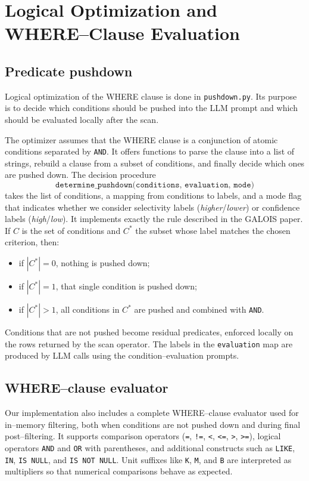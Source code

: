 \documentclass[11pt]{article}
\begin{document}
\clearpage
\section{Logical Optimization and WHERE–Clause Evaluation}

\subsection{Predicate pushdown}

Logical optimization of the WHERE clause is done in \texttt{pushdown.py}. Its purpose is to decide which conditions should be pushed into the LLM prompt and which should be evaluated locally after the scan.

The optimizer assumes that the WHERE clause is a conjunction of atomic conditions separated by \texttt{AND}. It offers functions to parse the clause into a list of strings, rebuild a clause from a subset of conditions, and finally decide which ones are pushed down. The decision procedure
\[
\texttt{determine\_pushdown(conditions, evaluation, mode)}
\]
takes the list of conditions, a mapping from conditions to labels, and a mode flag that indicates whether we consider selectivity labels (\emph{higher}/\emph{lower}) or confidence labels (\emph{high}/\emph{low}). It implements exactly the rule described in the GALOIS paper. If $C$ is the set of conditions and $C^\ast$ the subset whose label matches the chosen criterion, then:
\begin{itemize}
  \item if $|C^\ast| = 0$, nothing is pushed down;
  \item if $|C^\ast| = 1$, that single condition is pushed down;
  \item if $|C^\ast| > 1$, all conditions in $C^\ast$ are pushed and combined with \texttt{AND}.
\end{itemize}
Conditions that are not pushed become residual predicates, enforced locally on the rows returned by the scan operator. The labels in the \texttt{evaluation} map are produced by LLM calls using the condition–evaluation prompts.

\subsection{WHERE–clause evaluator}

Our implementation also includes a complete WHERE–clause evaluator used for in–memory filtering, both when conditions are not pushed down and during final post–filtering. It supports comparison operators (\texttt{=}, \texttt{!=}, \texttt{<}, \texttt{<=}, \texttt{>}, \texttt{>=}), logical operators \texttt{AND} and \texttt{OR} with parentheses, and additional constructs such as \texttt{LIKE}, \texttt{IN}, \texttt{IS NULL}, and \texttt{IS NOT NULL}. Unit suffixes like \texttt{K}, \texttt{M}, and \texttt{B} are interpreted as multipliers so that numerical comparisons behave as expected.
\end{document}

